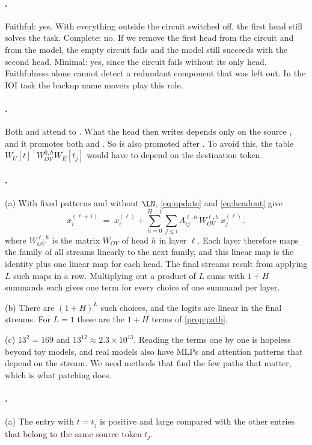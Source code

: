 {\paragraph{.}
Faithful: yes. With everything outside the circuit switched off, the first head still solves the task. Complete:
no. If we remove the first head from the circuit and from the model, the empty circuit fails and the model still
succeeds with the second head. Minimal: yes, since the circuit fails without its only head. Faithfulness alone
cannot detect a redundant component that was left out. In the IOI task the backup name movers play this role.

\paragraph{.}
Both  and  attend to . What the head then writes depends only on the source ,
and it promotes both  and . So  is also promoted after . To avoid this, the
table $W_U[t]^\top W_{OV}^{0,h}W_E[t_j]$ would have to depend on the destination token.

\paragraph{.}
(a) With fixed patterns and without $\LN$, \eqref{eq:update} and \eqref{eq:headout} give
\[
x_i^{(\ell+1)} \;=\; x_i^{(\ell)}+\sum_{h=0}^{H-1}\sum_{j\le i}A^{\ell,h}_{ij}\,W_{OV}^{\ell,h}\,x_j^{(\ell)},
\]
where $W_{OV}^{\ell,h}$ is the matrix $W_{OV}$ of head $h$ in layer $\ell$. Each layer therefore maps the
family of all streams linearly to the next family, and this linear map is the identity plus one linear map for
each head. The final streams result from applying $L$ such maps in a row. Multiplying out a product of $L$ sums
with $1+H$ summands each gives one term for every choice of one summand per layer.

(b) There are $(1+H)^L$ such choices, and the logits are linear in the final streams. For $L=1$ these are the
$1+H$ terms of \cref{prop:path}.

(c) $13^2=169$ and $13^{12}\approx2.3\times10^{13}$. Reading the terms one by one is hopeless beyond toy models,
and real models also have MLPs and attention patterns that depend on the stream. We need methods that find the
few paths that matter, which is what patching does.

\paragraph{.}
(a) The entry with $t=t_j$ is positive and large compared with the other entries that belong to the same source
token $t_j$.

}
